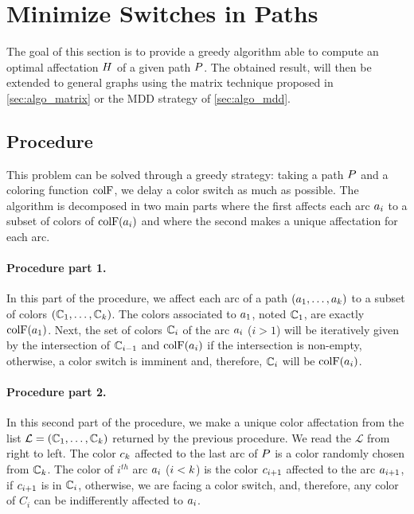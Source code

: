 \section{Minimize Switches in Paths}

The goal of this section is to provide a greedy algorithm able to compute an optimal affectation $H$ of a given path $P$. The obtained result, will then be extended to general graphs using the matrix technique proposed in \cref{sec:algo_matrix} or the MDD strategy of \cref{sec:algo_mdd}.

\subsection{Procedure}
\label{sec:path_proc}
This problem can be solved through a greedy strategy: taking a path $P$ and a coloring function $\text{colF}$, we delay a color switch as much as possible. The algorithm is decomposed in two main parts where the first affects each arc $a_i$ to a subset of colors of $\text{colF}(a_i)$ and where the second makes a unique affectation for each arc.

\paragraph{Procedure part 1.}
In this part of the procedure, we affect each arc of a path $(a_1,\ldots,a_{k})$ to a subset of colors $(\mathbb{C}_1,\ldots,\mathbb{C}_{k})$. The colors associated to $a_1$, noted $\mathbb{C}_1$, are exactly $\text{colF}(a_1)$. Next, the set of colors $\mathbb{C}_i$ of the arc $a_i$ ($i > 1$) will be iteratively given by the intersection of $\mathbb{C}_{i-1}$ and $\text{colF}(a_i)$ if the intersection is non-empty, otherwise, a color switch is imminent and, therefore, $\mathbb{C}_i$ will be $\text{colF}(a_i)$.

\paragraph{Procedure part 2.}
In this second part of the procedure, we make a unique color affectation from the list $\mathcal{L} = (\mathbb{C}_1,\ldots,\mathbb{C}_{k})$ returned by the previous procedure. We read the $\mathcal{L}$ from right to left. The color $c_k$ affected to the last arc of $P$ is a color randomly chosen from $\mathbb{C}_k$. The color of $i^{th}$ arc $a_{i}$ ($i < k$) is the color $c_{i+1}$ affected to the arc $a_{i+1}$, if $c_{i+1}$ is in $\mathbb{C}_i$, otherwise, we are facing a color switch, and, therefore, any color of $C_i$ can be indifferently affected to $a_i$.

